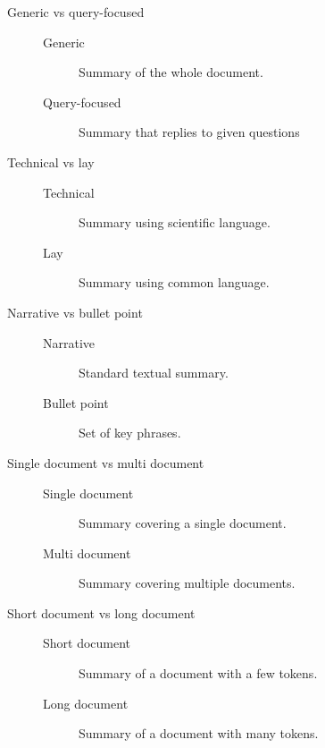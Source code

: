 \begin{description}
    \item[Generic vs query-focused] \phantom{}
        \begin{description}
            \item[Generic]
                Summary of the whole document.
            \item[Query-focused]
                Summary that replies to given questions
        \end{description}

    \item[Technical vs lay] \phantom{}
        \begin{description}
            \item[Technical]
                Summary using scientific language.
            \item[Lay]
                Summary using common language.
        \end{description}

    \item[Narrative vs bullet point] \phantom{}
        \begin{description}
            \item[Narrative]
                Standard textual summary.
            \item[Bullet point]
                Set of key phrases.
        \end{description}

    \item[Single document vs multi document] \phantom{}
        \begin{description}
            \item[Single document]
                Summary covering a single document.
            \item[Multi document]
                Summary covering multiple documents.
        \end{description}

    \item[Short document vs long document] \phantom{}
        \begin{description}
            \item[Short document]
                Summary of a document with a few tokens.
            \item[Long document]
                Summary of a document with many tokens.
        \end{description}
\end{description}



